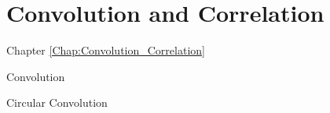 \section{Convolution and Correlation}
\label{Chap:Convolution_Correlation}
\begin{frame}[t]{Chapter \autoref{Chap:Convolution_Correlation}}
\tableofcontents[sections= \value{section}]
\end{frame}

\begin{frame}[t,allowframebreaks]{Convolution}



\end{frame}


\begin{frame}[t,allowframebreaks]{Circular Convolution}



\end{frame}
